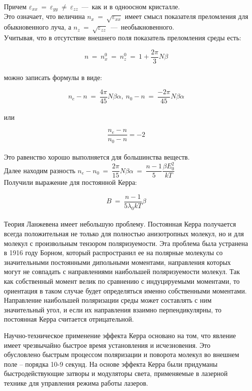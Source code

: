 \documentclass[a4paper, 12pt]{article}
\newcommand{\eps}{\varepsilon}
\begin{document}
    Причем $\eps_{xx} ~=~ \eps_{yy} ~\neq~ \eps_{zz}$~---~как и в одноосном кристалле.\\

    Это означает, что величина $n_x ~=~ \sqrt{\eps_{xx}}$ имеет смысл показателя преломления для обыкновенного луча, а $n_z ~=~ \sqrt{\eps_{zz}}$~---~необыкновенного.\\

    Учитывая, что в отсутствие внешнего поля показатель преломления среды есть:

    \[
        n ~=~ n^0_x ~=~ n^0_z ~=~ 1 + \dfrac{2 \pi}{3}N \beta
    \]\\

    можно записать формулы в виде:

    \[
        n_e - n ~=~ \dfrac{4 \pi}{45} N \beta \alpha,~ n_0 - n ~=~ \dfrac{-2 \pi}{45} N \beta \alpha
    \]\\

    или

    \[
        \dfrac{n_e - n}{n_0 - n} = -2
    \]\\

    Это равенство хорошо выполняется для большинства веществ.\\

    Далее находим разность $n_e - n_0 ~=~ \dfrac{2 \pi}{15} N \beta \alpha ~=~ \dfrac{n - 1}{5} \dfrac{\beta E_0^2}{k T}$\\

    Получили выражение для постоянной Керра:

    \[
        B~=~\dfrac{n-1}{5 \lambda_0 k T} \beta
    \]\\

    Теория Ланжевена имеет небольшую проблему. Постоянная Керра получается всегда положительная не только для полностью анизотропных молекул, но и для молекул с произвольным тензором поляризуемости. Эта проблема была устранена в 1916 году Борном, который распространил ее на полярные молекулы со значительными постоянными дипольными моментами, направления которых могут не совпадать с направлениями наибольшей поляризуемости молекул. Так как собственный момент велик по сравнению с индуцируемыми моментами, то ориентация в таком случае будет определяться именно собственными моментами. Направление наибольшей поляризации среды может составлять с ним значительный угол, и если их направления взаимно перпендикулярны, то постоянная Керра считается отрицательной.

    Научно-техническое применение эффекта Керра основано на том, что явление имеет чрезвычайно быстрое время установления и исчезновения. Это обусловлено быстрым процессом поляризации и поворота молекул во внешнем поле – порядка 10-9 секунд. На основе эффекта Керра были придуманы быстродействующие затворы и модуляторы света, применяемые в лазерной технике для управления режима работы лазеров.
\end{document}
